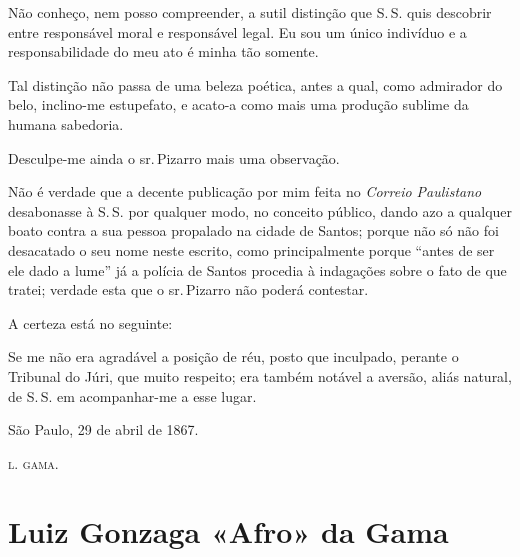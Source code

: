 Não conheço, nem posso compreender, a sutil distinção que S.\,S. quis
descobrir entre responsável moral e responsável legal. Eu sou um único
indivíduo e a responsabilidade do meu ato é minha tão somente.

Tal distinção não passa de uma beleza poética, antes a qual, como
admirador do belo, inclino-me estupefato, e acato-a como mais uma
produção sublime da humana sabedoria.

Desculpe-me ainda o sr.\,Pizarro mais uma observação.

Não é verdade que a decente publicação por mim feita no \emph{Correio
Paulistano} desabonasse à S.\,S. por qualquer modo, no conceito público,
dando azo a qualquer boato contra a sua pessoa propalado na cidade de
Santos; porque não só não foi desacatado o seu nome neste escrito, como
principalmente porque ``antes de ser ele dado a lume'' já a polícia de
Santos procedia à indagações sobre o fato de que tratei; verdade esta
que o sr.\,Pizarro não poderá contestar.

A certeza está no seguinte:

Se me não era agradável a posição de réu, posto que inculpado, perante o
Tribunal do Júri, que muito respeito; era também notável a aversão,
aliás natural, de S.\,S. em acompanhar-me a esse lugar.
\begin{flushright}
São Paulo, 29 de abril de 1867.

\textsc{l. gama}.
\end{flushright}

\part{Luiz Gonzaga «Afro» da Gama} %


